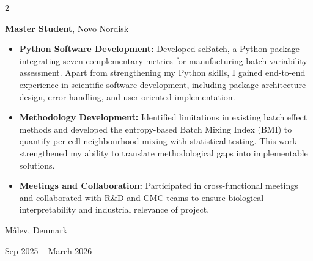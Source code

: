 \documentclass[10pt, letterpaper]{article}
\newenvironment{highlights}{
    \begin{itemize}[
        topsep=0.10 cm,
        parsep=0.10 cm,
        partopsep=0pt,
        itemsep=0pt,
        leftmargin=0.4 cm + 10pt
    ]
}{
    \end{itemize}
}
\newenvironment{twocolentry}[2][]{
    \onecolentry
    \def\secondColumn{#2}
    \setcolumnwidth{\fill, 4.5 cm}
    \begin{paracol}{2}
}{
    \switchcolumn \raggedleft \secondColumn
    \end{paracol}
    \endonecolentry
}
\begin{document}
        \begin{twocolentry}{
    Målev, Denmark

    Sep 2025 -- March 2026
}
    \textbf{Master Student}, Novo Nordisk

    \vspace{0.1cm}

    \begin{highlights}
        \item \textbf{Python Software Development:} Developed scBatch, a Python package integrating seven complementary metrics for manufacturing batch variability assessment. Apart from strengthening my Python skills, I gained end-to-end experience in scientific software development, including package architecture design, error handling, and user-oriented implementation.

        \vspace{0.1cm}

        \item \textbf{Methodology Development:} Identified limitations in existing batch effect methods and developed the entropy-based Batch Mixing Index (BMI) to quantify per-cell neighbourhood mixing with statistical testing. This work strengthened my ability to translate methodological gaps into implementable solutions.

        \vspace{0.1cm}

        \item \textbf{Meetings and Collaboration:} Participated in cross-functional meetings and collaborated with R\&D and CMC teams to ensure biological interpretability and industrial relevance of project.
    \end{highlights}
\end{twocolentry}

        \vspace{0.3 cm}
\end{document}

